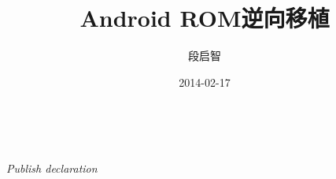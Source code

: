 \documentclass[UTF8, a4paper, 11pt, oneside]{ctexbook}
\begin{document}
\frontmatter
\title{Android ROM逆向移植}
\author{段启智}
\date{2014-02-17}
\maketitle

~
\vfill
\thispagestyle{empty}
\begin{center}
\it{Publish declaration}
\end{center}
\vfill
\newpage



\setcounter{tocdepth}{1}
\tableofcontents

\mainmatter
%
%
%

\backmatter

\appendix
%

%

\printindex
\end{document}
